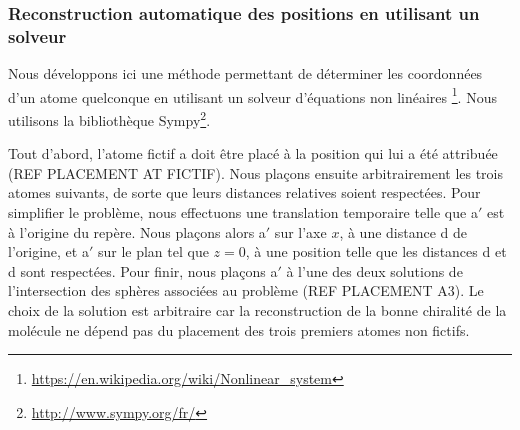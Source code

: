 \subsubsection{Reconstruction automatique des positions en utilisant un solveur}

\par Nous développons ici une méthode permettant de déterminer les coordonnées d'un atome quelconque en utilisant un solveur d'équations non linéaires \footnote{\url{https://en.wikipedia.org/wiki/Nonlinear_system}}. Nous utilisons la bibliothèque Sympy\footnote{\url{http://www.sympy.org/fr/}}.\\

\par Tout d'abord, l'atome fictif a doit être placé à la position qui lui a été attribuée (REF PLACEMENT AT FICTIF). Nous plaçons ensuite arbitrairement les trois atomes suivants, de sorte que leurs distances relatives soient respectées. Pour simplifier le problème, nous effectuons une translation temporaire telle que a$'$ est à l'origine du repère. Nous plaçons alors a$'$ sur l'axe $x$, à une distance d de l'origine, et a$'$ sur le plan tel que $z=0$, à une position telle que les distances d et d sont respectées. Pour finir, nous plaçons a$'$ à l'une des deux solutions de l'intersection des sphères associées au problème (REF PLACEMENT A3). Le choix de la solution est arbitraire car la reconstruction de la bonne chiralité de la molécule ne dépend pas du placement des trois premiers atomes non fictifs.\\



